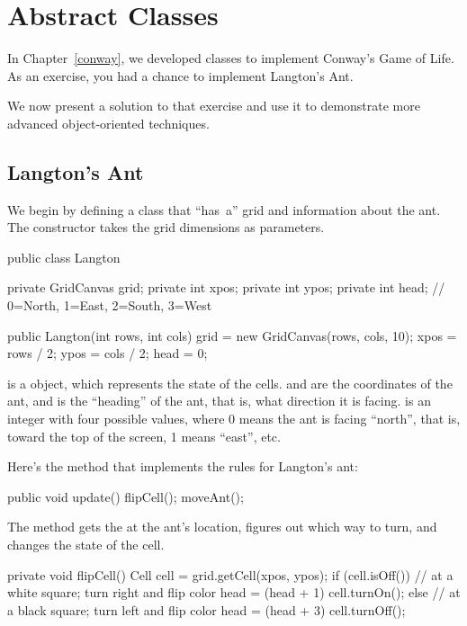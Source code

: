 \chapter{Abstract Classes}

In Chapter~\ref{conway}, we developed classes to implement Conway's Game of Life.
As an exercise, you had a chance to implement Langton's Ant.

We now present a solution to that exercise and use it to demonstrate more advanced object-oriented techniques.


\section{Langton's Ant}

We begin by defining a  class that ``has~a'' grid and information about the ant.
The constructor takes the grid dimensions as parameters.

\begin{code}
public class Langton {
    private GridCanvas grid;
    private int xpos;
    private int ypos;
    private int head; // 0=North, 1=East, 2=South, 3=West

    public Langton(int rows, int cols) {
        grid = new GridCanvas(rows, cols, 10);
        xpos = rows / 2;
        ypos = cols / 2;
        head = 0;
    }
}
\end{code}

 is a  object, which represents the state of the cells.
 and  are the coordinates of the ant, and  is the ``heading'' of the ant, that is, what direction it is facing.
 is an integer with four possible values, where 0 means the ant is facing ``north'', that is, toward the top of the screen, 1 means ``east'', etc.

Here's the  method that implements the rules for Langton's ant:

\begin{code}
public void update() {
    flipCell();
    moveAnt();
}
\end{code}

The  method gets the  at the ant's location, figures out which way to turn, and changes the state of the cell.

\begin{code}
private void flipCell() {
    Cell cell = grid.getCell(xpos, ypos);
    if (cell.isOff()) {
        // at a white square; turn right and flip color
        head = (head + 1) %
        cell.turnOn();
    } else {
        // at a black square; turn left and flip color
        head = (head + 3) %
        cell.turnOff();
    }
}
\end{code}

